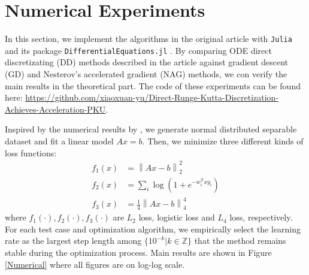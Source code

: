 \section{Numerical Experiments}
In this section, we implement the algorithms in the original article with \texttt{Julia} and its package \texttt{DifferentialEquations.jl} \cite{rackauckas2017differentialequations}. By comparing ODE direct discretizating (DD) methods described in the article against gradient descent (GD) and Nesterov's accelerated gradient (NAG) methods, we con verify the main results in the theoretical part. The code of these experiments can be found here: \url{https://github.com/xiaoxuan-yu/Direct-Runge-Kutta-Discretization-Achieves-Acceleration-PKU}.

Inspired by the numerical results by \textcite{NEURIPS2019_7a2b33c6}, we generate normal distributed separable dataset and fit a linear model \(Ax=b\). Then, we minimize three different kinds of loss functions:
\begin{equation}
    \begin{aligned}
        f_1(x) & = \left\| Ax-b \right\|_{2}^2                \\
        f_2(x) & = \sum_{i}\log(1+e^{-w_i^{\mathrm{T}}x y_i}) \\
        f_3(x) & = \frac{1}{4}\left\| Ax-b \right\|_{4}^4
    \end{aligned}
\end{equation}
where $f_1(\cdot ),f_2(\cdot ),f_3(\cdot )$ are $L_2$ loss, logistic loss and $L_4$ loss, respectively. For each test case and optimization algorithm, we empirically select the learning rate as the largest step length among $\{ 10^{-k}|k\in \mathbb{Z} \}$ that the method remains stable during the optimization process. Main results are shown in Figure \ref{Numerical} where all figures are on log-log scale.
